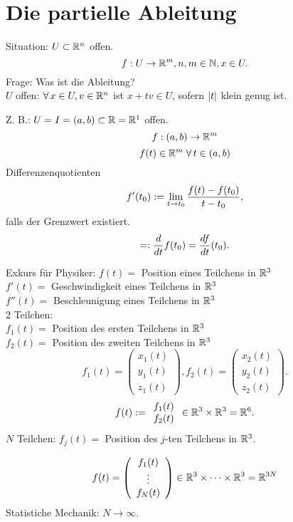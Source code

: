 \documentclass[../ana2.tex]{subfiles}
\begin{document}
\setcounter{section}{9}
\section{Die partielle Ableitung}
Situation: \( U \subset \mathbb{R}^n \) offen. 
\[ f:U\rightarrow \mathbb{R}^m, n,m\in\mathbb{N}, x\in U. \]
Frage: Was ist die Ableitung?\\
\( U \) offen: \( \forall x\in U, v\in \R^n \) 
ist \( x + tv \in U \), sofern 
\( \left|t\right| \) klein genug ist.

Z. B.: \( U = I = (a,b) \subset \mathbb{R} = \mathbb{R}^1 \)
offen. \[ f:(a,b)\rightarrow \mathbb{R}^m \]
\[ f(t) \in \R^m \;\forall t\in (a,b) \]
Differenzenquotienten 
\[ f'(t_0) := \lim\limits_{t\rightarrow{}t_0} 
\frac{f(t) - f(t_0)}{t - t_0}, \]
falls der Grenzwert existiert.
\[ =: \frac{d}{dt} f(t_0) = \frac{df}{dt} (t_0). \]

Exkurs für Physiker:
\( f(t) = \) Position eines Teilchens in \( \mathbb{R}^3 \) \\
\( f'(t) =  \) Geschwindigkeit eines Teilchens in \( \mathbb{R}^3 \) \\
\( f''(t) =  \) Beschleunigung eines Teilchens in \( \mathbb{R}^3 \) \\

2 Teilchen:\\ 
\( f_1(t) = \) Position des ersten Teilchens in \( \mathbb{R}^3 \) \\
\( f_2(t) = \) Position des zweiten Teilchens in \( \mathbb{R}^3 \)
\[ f_1(t) = \left( \begin{array}{c}
    x_1(t)\\
    y_1(t)\\
    z_1(t)
\end{array} \right), 
f_2(t) = \left( \begin{array}{c}
    x_2(t)\\
    y_2(t)\\
    z_2(t)
\end{array} \right). \]
\[ f(t) := \begin{array}{c}
    f_1(t)\\f_2(t)
\end{array} \in \mathbb{R}^3 \times \mathbb{R}^3 = \mathbb{R}^6. \]
\( N \) Teilchen: \( f_j(t) = \) Position 
des \( j \)-ten Teilchens in \( \mathbb{R}^3 \).

\[ f(t) = \left( \begin{array}{c}
    f_1(t)\\
    \vdots \\
    f_N(t)
\end{array} \right) \in \mathbb{R}^3 \times \cdots \times \mathbb{R}^3 
= \mathbb{R}^{3N} \]
Statistiche Mechanik: \( N \rightarrow \infty \).
\end{document}
